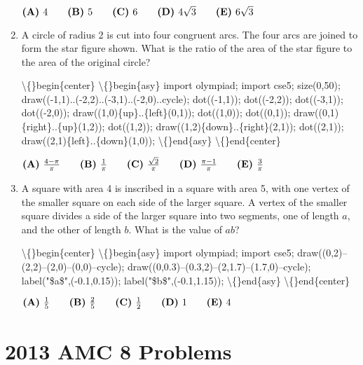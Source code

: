 \documentclass{article}
\begin{document}
\begin{enumerate}[label=\arabic*., itemsep=0.5em]
\( \textbf{(A)}\hspace{.05in}4\qquad\textbf{(B)}\hspace{.05in}5\qquad\textbf{(C)}\hspace{.05in}6\qquad\textbf{(D)}\hspace{.05in}4\sqrt3\qquad\textbf{(E)}\hspace{.05in}6\sqrt3 \)\par \vspace{0.5em}\item A circle of radius 2 is cut into four congruent arcs. The four arcs are joined to form the star figure shown. What is the ratio of the area of the star figure to the area of the original circle?



\textbackslash\{\}begin\{center\}
\textbackslash\{\}begin\{asy\}
import olympiad;
import cse5;
size(0,50);
draw((-1,1)..(-2,2)..(-3,1)..(-2,0)..cycle);
dot((-1,1));
dot((-2,2));
dot((-3,1));
dot((-2,0));
draw((1,0)\{up\}..\{left\}(0,1));
dot((1,0));
dot((0,1));
draw((0,1)\{right\}..\{up\}(1,2));
dot((1,2));
draw((1,2)\{down\}..\{right\}(2,1));
dot((2,1));
draw((2,1)\{left\}..\{down\}(1,0));
\textbackslash\{\}end\{asy\}
\textbackslash\{\}end\{center\}



\( \textbf{(A)}\hspace{.05in}\frac{4-\pi}{\pi}\qquad\textbf{(B)}\hspace{.05in}\frac{1}\pi\qquad\textbf{(C)}\hspace{.05in}\frac{\sqrt2}{\pi}\qquad\textbf{(D)}\hspace{.05in}\frac{\pi-1}{\pi}\qquad\textbf{(E)}\hspace{.05in}\frac{3}\pi \)\par \vspace{0.5em}\item A square with area 4 is inscribed in a square with area 5, with one vertex of the smaller square on each side of the larger square. A vertex of the smaller square divides a side of the larger square into two segments, one of length \( a \), and the other of length \( b \). What is the value of \( ab \)?


\textbackslash\{\}begin\{center\}
\textbackslash\{\}begin\{asy\}
import olympiad;
import cse5;
draw((0,2)--(2,2)--(2,0)--(0,0)--cycle);
draw((0,0.3)--(0.3,2)--(2,1.7)--(1.7,0)--cycle);
label("\$a\$",(-0.1,0.15));
label("\$b\$",(-0.1,1.15));
\textbackslash\{\}end\{asy\}
\textbackslash\{\}end\{center\}


\( \textbf{(A)}\hspace{.05in}\frac{1}5\qquad\textbf{(B)}\hspace{.05in}\frac{2}5\qquad\textbf{(C)}\hspace{.05in}\frac{1}2\qquad\textbf{(D)}\hspace{.05in}1\qquad\textbf{(E)}\hspace{.05in}4 \)\par \vspace{0.5em}\end{enumerate}\newpage\section*{2013 AMC 8 Problems}
\end{document}
